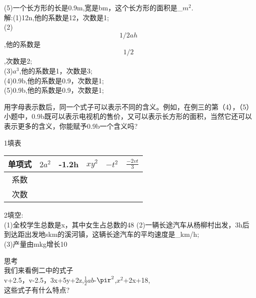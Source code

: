 \documentclass{ctexart}
\begin{document}
\begin{article}

\begin{example}
(5)一个长方形的长是0.9m,宽是bm，这个长方形的面积是_$m^{2}$.\\
解:(1)12n,他的系数是12，次数是1;\\
(2)$$1/2ah$$,他的系数是$$1/2$$,次数是2;\\
(3)$a^{3}$,他的系数是1，次数是3;\\
(4)0.9b,他的系数是0.9，次数是1;\\
(5)0.9b,他的系数是0.9，次数是1;\\

\end{example}
用字母表示数后，同一个式子可以表示不同的含义。例如，在例三的第（4），（5）小题中，0.9b既可以表示电视机的售价，又可以表示长方形的面积，当然它还可以表示更多的含义，你能赋予0.9b一个含义吗?\\
\begin{ex}
1填表\\
\begin{tabular}{|c|c|c|c|c|c|}
\hline  %
单项式&$2a^{2}$&-1.2h& $xy^{2}$& $-t^{2}$&$\frac{-2vt}{3}$\\
\hline
系数&&&&&\\
\hline
次数&&&&&\\
\hline
  \end{tabular}
2填空:\\
(1)全校学生总数是x，其中女生占总数的48%
(2)一辆长途汽车从杨柳村出发，3h后到达距出发地skm的溪河镇，这辆长途汽车的平均速度是\_km/h;\\
(3)产量由mkg增长10%

\end{ex}
思考\\
我们来看例二中的式子\\
v+2.5，v-2.5，3x+5y+2z,$\frac{1}{2}ab$-$\pir^{2}$,$x^{2}$+2x+18,\\
这些式子有什么特点?\\
\end{article}
\end{document}
